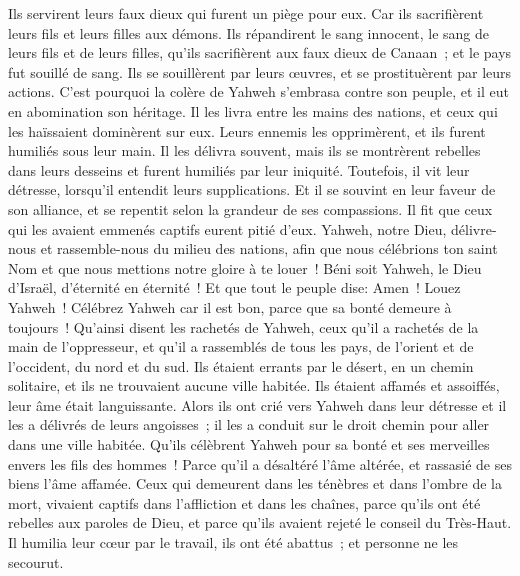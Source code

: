 \begin{multicols}{2}
Ils servirent leurs faux dieux qui furent un piège pour eux.
Car ils sacrifièrent leurs fils et leurs filles aux démons.
Ils répandirent le sang innocent, le sang de leurs fils et de leurs filles, qu'ils sacrifièrent aux faux dieux de Canaan~; et le pays fut souillé de sang.
Ils se souillèrent par leurs œuvres, et se prostituèrent par leurs actions.
C'est pourquoi la colère de Yahweh s'embrasa contre son peuple, et il eut en abomination son héritage.
Il les livra entre les mains des nations, et ceux qui les haïssaient dominèrent sur eux.
Leurs ennemis les opprimèrent, et ils furent humiliés sous leur main.
Il les délivra souvent, mais ils se montrèrent rebelles dans leurs desseins et furent humiliés par leur iniquité.
Toutefois, il vit leur détresse, lorsqu'il entendit leurs supplications.
Et il se souvint en leur faveur de son alliance, et se repentit selon la grandeur de ses compassions.
Il fit que ceux qui les avaient emmenés captifs eurent pitié d'eux.
Yahweh, notre Dieu, délivre-nous et rassemble-nous du milieu des nations, afin que nous célébrions ton saint Nom et que nous mettions notre gloire à te louer~!
Béni soit Yahweh, le Dieu d'Israël, d'éternité en éternité~! Et que tout le peuple dise: Amen~! Louez Yahweh~!
\VerseOne{}Célébrez Yahweh car il est bon, parce que sa bonté demeure à toujours~!
Qu'ainsi disent les rachetés de Yahweh, ceux qu'il a rachetés de la main de l'oppresseur,
et qu'il a rassemblés de tous les pays, de l'orient et de l'occident, du nord et du sud.
Ils étaient errants par le désert, en un chemin solitaire, et ils ne trouvaient aucune ville habitée. 
Ils étaient affamés et assoiffés, leur âme était languissante.
Alors ils ont crié vers Yahweh dans leur détresse et il les a délivrés de leurs angoisses~;
il les a conduit sur le droit chemin pour aller dans une ville habitée.
Qu'ils célèbrent Yahweh pour sa bonté et ses merveilles envers les fils des hommes~!
Parce qu'il a désaltéré l'âme altérée, et rassasié de ses biens l'âme affamée.
Ceux qui demeurent dans les ténèbres et dans l'ombre de la mort, vivaient captifs dans l'affliction et dans les chaînes,
parce qu'ils ont été rebelles aux paroles de Dieu, et parce qu'ils avaient rejeté le conseil du Très-Haut.
Il humilia leur cœur par le travail, ils ont été abattus~; et personne ne les secourut.

\end{multicols}
